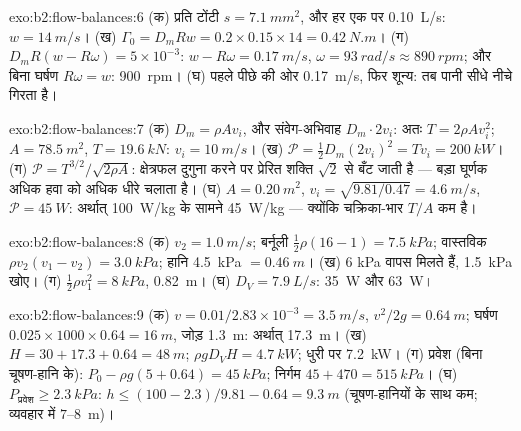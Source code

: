 \begin{solution}{exo:b2:flow-balances:6}
(क) प्रति टोंटी $s = \qty{7.1}{mm^2}$, और हर एक पर \qty{0.10}{L/s}: $w = \qty{14}{m/s}$। (ख)
$\Gamma_0 = D_mRw = 0.2 \times 0.15 \times 14 = \qty{0.42}{N.m}$। (ग) $D_mR(w - R\omega) =
5 \times 10^{-3}$: $w - R\omega = \qty{0.17}{m/s}$, $\omega = \qty{93}{rad/s} \approx \qty{890}{rpm}$;
और बिना घर्षण $R\omega = w$: \qty{900}{rpm}। (घ) पहले पीछे की ओर \qty{0.17}{m/s}, फिर
शून्य: तब पानी सीधे नीचे गिरता है।
\end{solution}

\begin{solution}{exo:b2:flow-balances:7}
(क) $D_m = \rho Av_i$, और संवेग-अभिवाह $D_m\cdot2v_i$: अतः $T = 2\rho Av_i^2$; $A = \qty{78.5}{m^2}$,
$T = \qty{19.6}{kN}$: $v_i = \qty{10}{m/s}$। (ख) $\mathcal P = \tfrac12D_m(2v_i)^2 = Tv_i =
\qty{200}{kW}$। (ग) $\mathcal P = T^{3/2}/\sqrt{2\rho A}$: क्षेत्रफल दुगुना करने पर
प्रेरित शक्ति $\sqrt2$ से बँट जाती है --- बड़ा घूर्णक अधिक हवा को
अधिक धीरे चलाता है। (घ) $A = \qty{0.20}{m^2}$, $v_i = \sqrt{9.81/0.47} = \qty{4.6}{m/s}$, $\mathcal P
= \qty{45}{W}$: अर्थात् \qty{100}{W/kg} के सामने \qty{45}{W/kg} --- क्योंकि चक्रिका-भार $T/A$
कम है।
\end{solution}

\begin{solution}{exo:b2:flow-balances:8}
(क) $v_2 = \qty{1.0}{m/s}$; बर्नूली $\tfrac12\rho(16 - 1) = \qty{7.5}{kPa}$; वास्तविक
$\rho v_2(v_1 - v_2) = \qty{3.0}{kPa}$; हानि \qty{4.5}{kPa} $= \qty{0.46}{m}$। (ख) $6$ kPa
वापस मिलते हैं, \qty{1.5}{kPa} खोए। (ग) $\tfrac12\rho v_1^2 = \qty{8}{kPa}$, \qty{0.82}{m}। (घ)
$D_V = \qty{7.9}{L/s}$: \qty{35}{W} और \qty{63}{W}।
\end{solution}

\begin{solution}{exo:b2:flow-balances:9}
(क) $v = 0.01/2.83 \times 10^{-3} = \qty{3.5}{m/s}$, $v^2/2g = \qty{0.64}{m}$; घर्षण
$0.025 \times 1000 \times 0.64 = \qty{16}{m}$, जोड़ \qty{1.3}{m}: अर्थात् \qty{17.3}{m}। (ख)
$H = 30 + 17.3 + 0.64 = \qty{48}{m}$; $\rho gD_VH = \qty{4.7}{kW}$; धुरी पर \qty{7.2}{kW}।
(ग) प्रवेश (बिना चूषण-हानि के): $P_0 - \rho g(5 + 0.64) = \qty{45}{kPa}$;
निर्गम $45 + 470 = \qty{515}{kPa}$। (घ) $P_{\text{प्रवेश}} \ge \qty{2.3}{kPa}$: $h \le (100 -
2.3)/9.81 - 0.64 = \qty{9.3}{m}$ (चूषण-हानियों के साथ कम; व्यवहार में
$7$--\qty{8}{m})।
\end{solution}

